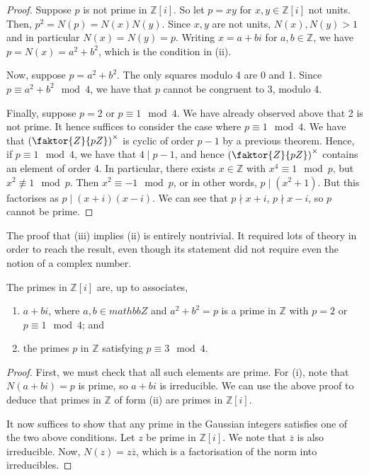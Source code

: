 \begin{proof}
    Suppose \( p \) is not prime in \( \mathbb Z[i] \).
    So let \( p = xy \) for \( x, y \in \mathbb Z[i] \) not units.
    Then, \( p^2 = N(p) = N(x)N(y) \).
    Since \( x, y \) are not units, \( N(x), N(y) > 1 \) and in particular \( N(x) = N(y) = p \).
    Writing \( x = a+bi \) for \( a, b \in \mathbb Z \), we have \( p = N(x) = a^2 + b^2 \), which is the condition in (ii).

    Now, suppose \( p = a^2 + b^2 \).
    The only squares modulo 4 are 0 and 1.
    Since \( p \equiv a^2 + b^2 \mod 4 \), we have that \( p \) cannot be congruent to 3, modulo 4.

    Finally, suppose \( p = 2 \) or \( p \equiv 1 \mod 4 \).
    We have already observed above that 2 is not prime.
    It hence suffices to consider the case where \( p \equiv 1 \mod 4 \).
    We have that \( \qty(\faktor{Z}{pZ})^\times \) is cyclic of order \( p-1 \) by a previous theorem.
    Hence, if \( p \equiv 1 \mod 4 \), we have that \( 4 \mid p-1 \), and hence \( \qty(\faktor{Z}{pZ})^\times \) contains an element of order 4.
    In particular, there exists \( x \in \mathbb Z \) with \( x^4 \equiv 1 \mod p \), but \( x^2 \not\equiv 1 \mod p \).
    Then \( x^2 \equiv -1 \mod p \), or in other words, \( p \mid (x^2 + 1) \).
    But this factorises as \( p \mid (x+i)(x-i) \).
    We can see that \( p \nmid x+i \), \( p \nmid x-i \), so \( p \) cannot be prime.
\end{proof}
\begin{remark}
    The proof that (iii) implies (ii) is entirely nontrivial.
    It required lots of theory in order to reach the result, even though its statement did not require even the notion of a complex number.
\end{remark}
\begin{theorem}
    The primes in \( \mathbb Z[i] \) are, up to associates,
    \begin{enumerate}
        \item \( a + bi \), where \( a, b \in mathbb Z \) and \( a^2 + b^2 = p \) is a prime in \( \mathbb Z \) with \( p = 2 \) or \( p \equiv 1 \mod 4 \); and
        \item the primes \( p \) in \( \mathbb Z \) satisfying \( p \equiv 3 \mod 4 \).
    \end{enumerate}
\end{theorem}
\begin{proof}
    First, we must check that all such elements are prime.
    For (i), note that \( N(a+bi) = p \) is prime, so \( a+bi \) is irreducible.
    We can use the above proof to deduce that primes in \( \mathbb Z \) of form (ii) are primes in \( \mathbb Z[i] \).

    It now suffices to show that any prime in the Gaussian integers satisfies one of the two above conditions.
    Let \( z \) be prime in \( \mathbb Z[i] \).
    We note that \( \overline z \) is also irreducible.
    Now, \( N(z) = z\overline z \), which is a factorisation of the norm into irreducibles.
\end{proof}
